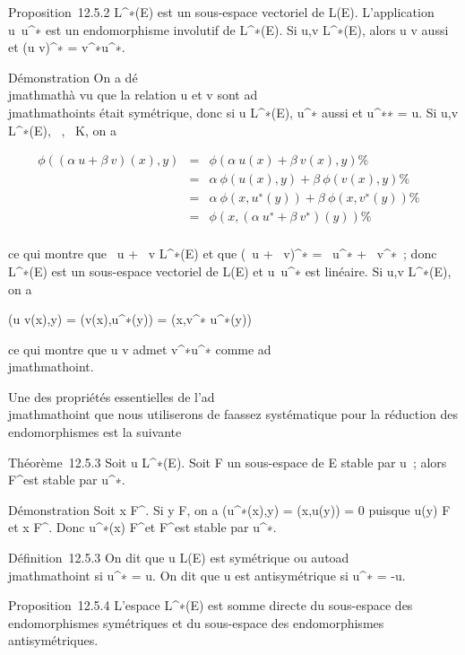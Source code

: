 \documentclass[]{article}
\begin{document}
Proposition~12.5.2 L^∗(E) est un sous-espace vectoriel de
L(E). L'application u\mapsto~u^∗ est un
endomorphisme involutif de L^∗(E). Si u,v \in
L^∗(E), alors u \cdot v aussi et (u \cdot v)^∗ =
v^∗\cdot u^∗.

Démonstration On a dé\\jmathmathà vu que la relation u et v sont ad\\jmathmathoints était
symétrique, donc si u \in L^∗(E), u^∗ aussi et
u^∗∗ = u. Si u,v \in L^∗(E), \alpha~,\beta~ \in K, on a

\begin{align*} \phi((\alpha~u + \beta~v)(x),y)& =& \phi(\alpha~u(x) +
\beta~v(x),y) \%& \\ & =& \alpha~\phi(u(x),y) +
\beta~\phi(v(x),y) \%& \\ & =&
\alpha~\phi(x,u^∗(y)) + \beta~\phi(x,v^∗(y))\%&
\\ & =& \phi(x,(\alpha~u^∗ +
\beta~v^∗)(y)) \%& \\
\end{align*}

ce qui montre que \alpha~u + \beta~v \in L^∗(E) et que (\alpha~u +
\beta~v)^∗ = \alpha~u^∗ + \beta~v^∗~; donc
L^∗(E) est un sous-espace vectoriel de L(E) et
u\mapsto~u^∗ est linéaire. Si u,v \in
L^∗(E), on a

\phi(u \cdot v(x),y) = \phi(v(x),u^∗(y)) = \phi(x,v^∗\cdot
u^∗(y))

ce qui montre que u \cdot v admet v^∗\cdot u^∗ comme
ad\\jmathmathoint.

Une des propriétés essentielles de l'ad\\jmathmathoint que nous utiliserons de
fa\ccon assez systématique pour la réduction des
endomorphismes est la suivante

Théorème~12.5.3 Soit u \in L^∗(E). Soit F un sous-espace de E
stable par u~; alors F^\bot est stable par u^∗.

Démonstration Soit x \in F^\bot. Si y \in F, on a
\phi(u^∗(x),y) = \phi(x,u(y)) = 0 puisque u(y) \in F et x \in
F^\bot. Donc u^∗(x) \in F^\bot et
F^\bot est stable par u^∗.

Définition~12.5.3 On dit que u \in L(E) est symétrique ou autoad\\jmathmathoint si
u^∗ = u. On dit que u est antisymétrique si u^∗ =
-u.

Proposition~12.5.4 L'espace L^∗(E) est somme directe du
sous-espace des endomorphismes symétriques et du sous-espace des
endomorphismes antisymétriques.
\end{document}
